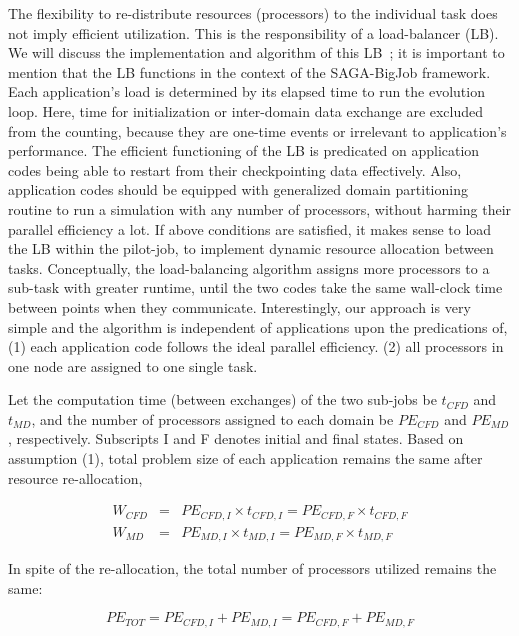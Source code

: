 \documentclass[conference,final]{IEEEtran}
\begin{document}
The flexibility to re-distribute resources (processors) to the individual task does not imply efficient utilization. This is the responsibility of a load-balancer (LB). We will discuss the implementation and algorithm of this LB~\cite{Ko}; it is important to mention that the LB functions in the context of the SAGA-BigJob framework.
Each application's load is determined by its elapsed time to run the evolution loop. Here, time for initialization or inter-domain data exchange are excluded from the counting, because they are one-time events or irrelevant to application's performance.  The efficient functioning of the LB is predicated on application codes being able to restart from their checkpointing data effectively.  Also, application codes should be equipped with generalized domain partitioning routine to run a simulation with any number of processors, without harming their parallel efficiency a lot. If above conditions are satisfied, it makes sense to load the LB within the pilot-job, to implement dynamic resource allocation between tasks.  Conceptually, the load-balancing algorithm assigns more processors to a sub-task with greater runtime, until the two codes take the same wall-clock time between points when they communicate.
Interestingly, our approach is very simple and the algorithm is independent of applications upon the predications of,
(1) each application code follows the ideal parallel efficiency.
(2) all processors in one node are assigned to one single task.

Let the computation time (between exchanges) of the two sub-jobs be $t_{CFD}$ and $t_{MD}$, and the number of processors assigned to each domain be $PE_{CFD}$ and $PE_{MD}$, respectively. Subscripts I and F denotes initial and final states. Based on assumption (1), total problem size of each application remains the same after resource re-allocation,

\vspace{-.2em}
\footnotesize
\begin{eqnarray}
W_{CFD}&=&PE_{CFD,I}\times t_{CFD,I}=PE_{CFD,F}\times t_{CFD,F} \nonumber \\
W_{MD}&=&PE_{MD,I}\times t_{MD,I}=PE_{MD,F}\times t_{MD,F}
\label{eq:SimTime_EachTask}
\end{eqnarray}
\normalsize

In spite of the re-allocation, the total number of processors utilized remains the same:

\vspace{-.2em}
\footnotesize
\begin{equation}
PE_{TOT}=PE_{CFD,I}+PE_{MD,I}=PE_{CFD,F}+PE_{MD,F}
\label{eq:PECondition}
\end{equation}
\normalsize
\end{document}
